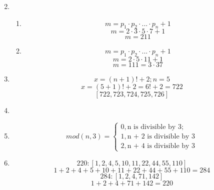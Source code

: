 \begin{enumerate}
\begin{multicols}{2}
        \end{multicols}
    \item
        \begin{enumerate}
            \item
                \[m = p_1 \cdot p_2 \cdot ... \cdot p_n + 1\]
                \[m = 2 \cdot 3 \cdot 5 \cdot 7 + 1\]
                \[m = 211\]
            \item
                \[m = p_1 \cdot p_2 \cdot ... \cdot p_n + 1\]
                \[m = 2 \cdot 5 \cdot 11 + 1\]
                \[m = 111 = 3 \cdot 37\]
        \end{enumerate}
    \item
        \[x = (n + 1)! + 2; n = 5\]
        \[x = (5 + 1)! + 2 = 6! + 2 = 722\]
        \[[722, 723, 724, 725, 726]\]
    \item
        \begin{center}
        \end{center}
    \item
    \begin{equation}
        mod(n,3) =
        \begin{cases}
            0, \text{n is divisible by 3}; \\
            1, \text{n + 2 is divisible by 3} \\
            2, \text{n + 4 is divisible by 3}
        \end{cases}
    \end{equation}
    \item
        \[220: [1, 2, 4, 5, 10, 11, 22, 44, 55, 110]\]
        \[1 + 2 + 4 + 5 + 10 + 11 + 22 + 44 + 55 + 110 = 284\]
        \[284: [1, 2, 4, 71, 142]\]
        \[1 + 2 + 4 + 71 + 142 = 220\]
\end{enumerate}
